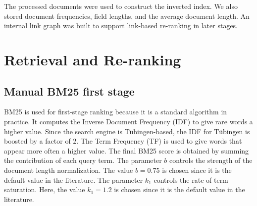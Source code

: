 \documentclass[10pt,a4paper]{article}
\begin{document}
The processed documents were used to construct the inverted index. We also stored document
frequencies, field lengths, and the average document length. An internal link graph was built to
support link-based re-ranking in later stages.

\section{Retrieval and Re-ranking}

\subsection{Manual BM25 first stage}
BM25 is used for first-stage ranking because it is a standard algorithm in practice.
It computes the Inverse Document Frequency (IDF) to give rare words a higher value.
Since the search engine is T\"ubingen-based, the IDF for T\"ubingen is boosted by a factor of $2$.
The Term Frequency (TF) is used to give words that appear more often a higher value. 
The final BM25 score is obtained by summing the contribution of each query term.
The parameter $b$ controls the strength of the document length normalization.
The value $b = 0.75$ is chosen since it is the default value in the literature.
The parameter $k_1$ controls the rate of term saturation. Here, the value $k_1 = 1.2$ is chosen since it is the default value in the literature.
\cite{robertson2009bm25}
\end{document}
